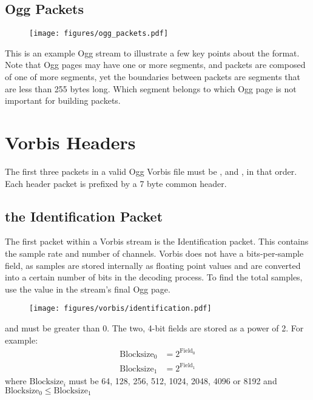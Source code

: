 \clearpage

\subsection{Ogg Packets}
\begin{figure}[h]
\texttt{[image: figures/ogg\_packets.pdf]}
\end{figure}
\par
\noindent
This is an example Ogg stream to illustrate a few key points about
the format.
Note that Ogg pages may have one or more segments,
and packets are composed of one of more segments,
yet the boundaries between packets are segments
that are less than 255 bytes long.
Which segment belongs to which Ogg page is not important
for building packets.

\section{Vorbis Headers}

The first three packets in a valid Ogg Vorbis file must be
,  and , in that order.
Each header packet is prefixed by a 7 byte common header.

\clearpage

\subsection{the Identification Packet}
The first packet within a Vorbis stream is the Identification packet.
This contains the sample rate and number of channels.
Vorbis does not have a bits-per-sample field, as samples
are stored internally as floating point values and are
converted into a certain number of bits in the decoding process.
To find the total samples, use the  value
in the stream's final Ogg page.
\begin{figure}[h]
\texttt{[image: figures/vorbis/identification.pdf]}
\end{figure}
\par
\noindent
{} and  must be greater than 0.
The two, 4-bit  fields are stored as a power of 2.
For example:
\begin{align*}
\text{Blocksize}_0 &= 2 ^ {\text{Field}_0} \\
\text{Blocksize}_1 &= 2 ^ {\text{Field}_1}
\end{align*}
where $\text{Blocksize}_i$ must be 64, 128, 256, 512, 1024, 2048, 4096 or 8192
and
\linebreak
$\text{Blocksize}_0 \leq \text{Blocksize}_1$

